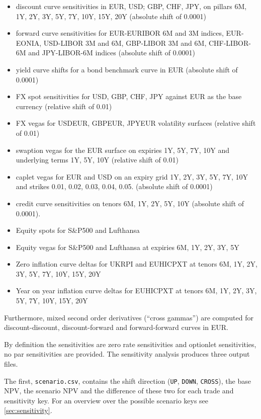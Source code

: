 \documentclass[12pt, a4paper]{article}
\begin{document}
{\begin{itemize}
\item discount curve sensitivities in EUR, USD; GBP, CHF, JPY, on pillars 6M, 1Y, 2Y, 3Y, 5Y, 7Y, 10Y, 15Y, 20Y (absolute shift of 0.0001)
\item forward curve sensitivities for EUR-EURIBOR 6M and 3M indices, EUR-EONIA, USD-LIBOR 3M and 6M, GBP-LIBOR 3M and
  6M, CHF-LIBOR-6M and JPY-LIBOR-6M indices (absolute shift of 0.0001)
\item yield curve shifts for a bond benchmark curve in EUR (absolute shift of 0.0001)
\item FX spot sensitivities for USD, GBP, CHF, JPY against EUR as the base currency (relative shift of 0.01)
\item FX vegas for USDEUR, GBPEUR, JPYEUR volatility surfaces (relative shift of 0.01)
\item swaption vegas for the EUR surface on expiries 1Y, 5Y, 7Y, 10Y and underlying terms 1Y, 5Y, 10Y (relative shift of 0.01)
\item caplet vegas for EUR and USD on an expiry grid 1Y, 2Y, 3Y, 5Y, 7Y, 10Y and strikes 0.01, 0.02, 0.03, 0.04,
  0.05. (absolute shift of 0.0001)
\item credit curve sensitivities on tenors 6M, 1Y, 2Y, 5Y, 10Y (absolute shift of 0.0001).
\item Equity spots for S\&P500 and Lufthansa
\item Equity vegas for S\&P500 and Lufthansa at expiries 6M, 1Y, 2Y, 3Y, 5Y
\item Zero inflation curve deltas for UKRPI and EUHICPXT at tenors 6M, 1Y, 2Y, 3Y, 5Y, 7Y, 10Y, 15Y, 20Y
\item Year on year inflation curve deltas for EUHICPXT at tenors 6M, 1Y, 2Y, 3Y, 5Y, 7Y, 10Y, 15Y, 20Y
\end{itemize}

Furthermore, mixed second order derivatives (``cross gammas'') are computed for discount-discount, discount-forward and
forward-forward curves in EUR.

By definition the sensitivities are zero rate sensitivities and optionlet sensitivities, no par sensitivities are
provided. The sensitivity analysis produces three output files.

The first, {\tt scenario.csv}, contains the shift
direction ({\tt UP}, {\tt DOWN}, {\tt CROSS}), the base NPV, the scenario NPV and the difference of these two for each
trade and sensitivity key. For an overview over the possible scenario keys see \ref{sec:sensitivity}.

}
\end{document}
